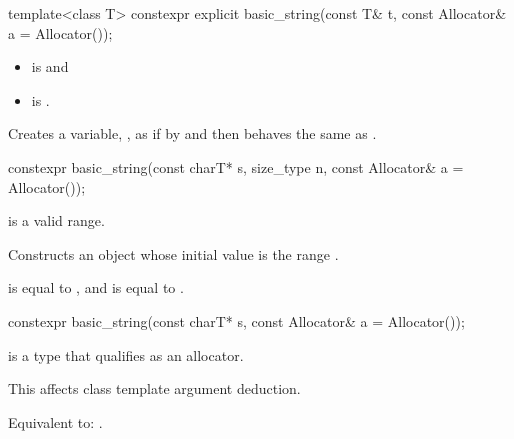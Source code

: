 %
\begin{itemdecl}
template<class T>
  constexpr explicit basic_string(const T& t, const Allocator& a = Allocator());
\end{itemdecl}

\begin{itemdescr}
\pnum
\constraints
\begin{itemize}
\item
{} is
 and
\item
{} is
.
\end{itemize}

\pnum
\effects
Creates a variable, , as if by
 and
then behaves the same as .
\end{itemdescr}

%
\begin{itemdecl}
constexpr basic_string(const charT* s, size_type n, const Allocator& a = Allocator());
\end{itemdecl}

\begin{itemdescr}
\pnum
\expects
{} is a valid range.

\pnum
\effects
Constructs an object whose initial value is the range .

\pnum
\ensures
{} is equal to , and
 is equal to .
\end{itemdescr}

%
\begin{itemdecl}
constexpr basic_string(const charT* s, const Allocator& a = Allocator());
\end{itemdecl}

\begin{itemdescr}
\pnum
\constraints
{} is a type
that qualifies as an allocator.
\begin{note}
This affects class template argument deduction.
\end{note}

\pnum
\effects
Equivalent to: .
\end{itemdescr}

